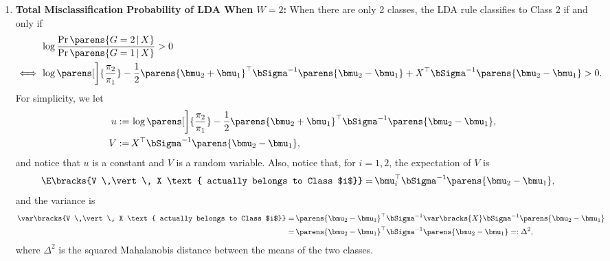 \documentclass[12pt]{article}
\begin{document}
\begin{enumerate}[label=\textbf{\arabic*.}]
	\item \textbf{Total Misclassification Probability of LDA When $W = 2$:} 
	When there are only 2 classes, the LDA rule classifies to Class 2 if and only if
	\begin{align*}
		& \, \log \frac{\Pr \parens{G = 2 \,\vert\, X}}{\Pr \parens{G = 1 \,\vert\, X}} > 0 \\ 
		\iff & \, \log \parens[\bigg]{\frac{\pi_2}{\pi_1}} - \frac{1}{2} \parens{\bmu_2 + \bmu_1}^\top \bSigma^{-1} \parens{\bmu_2 - \bmu_1} + X^\top \bSigma^{-1} \parens{\bmu_2 - \bmu_1} > 0. 
	\end{align*}
	For simplicity, we let 
	\begin{align*}
		u := & \, \log \parens[\bigg]{\frac{\pi_2}{\pi_1}} - \frac{1}{2} \parens{\bmu_2 + \bmu_1}^\top \bSigma^{-1} \parens{\bmu_2 - \bmu_1}, \\ 
		V := & \, X^\top \bSigma^{-1} \parens{\bmu_2 - \bmu_1},  
	\end{align*}
	and notice that $u$ is a constant and $V$ is a random variable. Also, notice that, for $i = 1, 2$, the expectation of $V$ is 
	\begin{align*}
		\E \bracks{V \,\vert\, X \text{ actually belongs to Class $i$}} = & \, \bmu_i^\top \bSigma^{-1} \parens{\bmu_2 - \bmu_1}, 
	\end{align*}
	and the variance is 
	\begin{align*}
		\var \bracks{V \,\vert\, X \text{ actually belongs to Class $i$}} = & \, \parens{\bmu_2 - \bmu_1}^\top \bSigma^{-1} \var \bracks{X} \bSigma^{-1} \parens{\bmu_2 - \bmu_1} \\ 
		= & \, \parens{\bmu_2 - \bmu_1}^\top \bSigma^{-1} \parens{\bmu_2 - \bmu_1} =: \Delta^2, 
	\end{align*}
	where $\Delta^2$ is the squared Mahalanobis distance between the means of the two classes. 
	

\end{enumerate}
\end{document}

